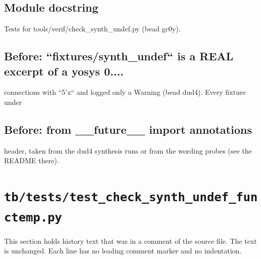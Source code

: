 \begin{record}

\subsection*{Module docstring}

\begin{textblock}
Tests for tools/verif/check_synth_undef.py (bead gc0y).
\end{textblock}

\subsection*{Before: ``fixtures/synth\_undef`` is a REAL excerpt of a yosys 0....}

\begin{textblock}
connections with ``5'x`` and logged only a Warning (bead dud4).  Every fixture under
\end{textblock}

\subsection*{Before: from \_\_future\_\_ import annotations}

\begin{textblock}
header, taken from the dud4 synthesis runs or from the wording probes (see the README there).
\end{textblock}

\end{record}

\section{\texttt{tb/tests/test\_check\_synth\_undef\_functemp.py}}\label{cr:suite:test-check-synth-undef-functemp}

This section holds history text that was in a comment of the source file. The text is unchanged. Each line has no leading comment marker and no indentation.

